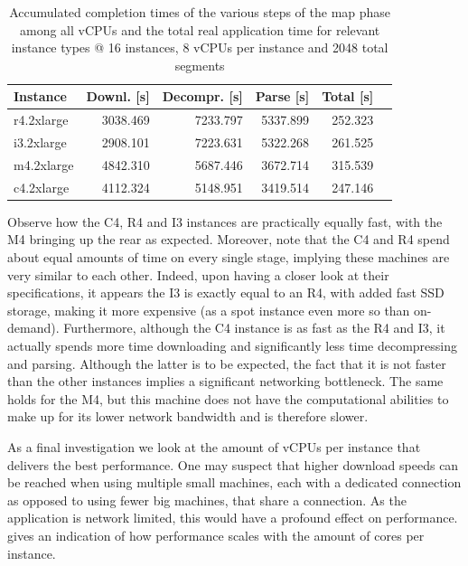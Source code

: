\documentclass{article}
\begin{document}
\begin{table}[H]
	\centering
	\caption{Accumulated completion times of the various steps of the map phase among all vCPUs and the total real application time for relevant instance types @ 16 instances, 8 vCPUs per instance and 2048 total segments}
	\label{tab:instance-comparison}

	\begin{tabular}{lrrrrr}
	\toprule
	Instance	& 	Downl. [s]	& Decompr. [s]	& Parse [s] 	& Total [s]	\\
	\midrule
	r4.2xlarge	&	3038.469	&	7233.797	&	5337.899	&	252.323 \\
	i3.2xlarge	&	2908.101	&	7223.631	&	5322.268	&	261.525 \\
	m4.2xlarge	&	4842.310	&	5687.446	&	3672.714	&	315.539 \\
	c4.2xlarge	&	4112.324	&	5148.951	&	3419.514	&	247.146 \\
	\bottomrule
	\end{tabular}
\end{table}

Observe how the C4, R4 and I3 instances are practically equally fast, with the M4 bringing up the rear as expected.
Moreover, note that the C4 and R4 spend about equal amounts of time on every single stage, implying these machines are very similar to each other.
Indeed, upon having a closer look at their specifications, it appears the I3 is exactly equal to an R4, with added fast SSD storage, making it more expensive (as a spot instance even more so than on-demand).
Furthermore, although the C4 instance is as fast as the R4 and I3, it actually spends more time downloading and significantly less time decompressing and parsing.
Although the latter is to be expected, the fact that it is not faster than the other instances implies a significant networking bottleneck.
The same holds for the M4, but this machine does not have the computational abilities to make up for its lower network bandwidth and is therefore slower.

As a final investigation we look at the amount of vCPUs per instance that delivers the best performance.
One may suspect that higher download speeds can be reached when using multiple small machines, each with a dedicated connection as opposed to using fewer big machines, that share a connection.
As the application is network limited, this would have a profound effect on performance.
 gives an indication of how performance scales with the amount of cores per instance.
\end{document}
